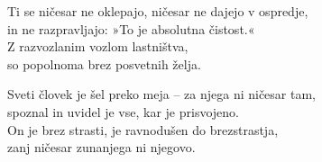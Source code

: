 Ti se ničesar ne oklepajo, ničesar ne dajejo v ospredje,\\
in ne razpravljajo: »To je absolutna čistost.«\\
Z razvozlanim vozlom lastništva,\\
so popolnoma brez posvetnih želja.

Sveti človek je šel preko meja -- za njega ni ničesar tam,\\
spoznal in uvidel je vse, kar je prisvojeno.\\
On je brez strasti, je ravnodušen do brezstrastja,\\
zanj ničesar zunanjega ni njegovo.

